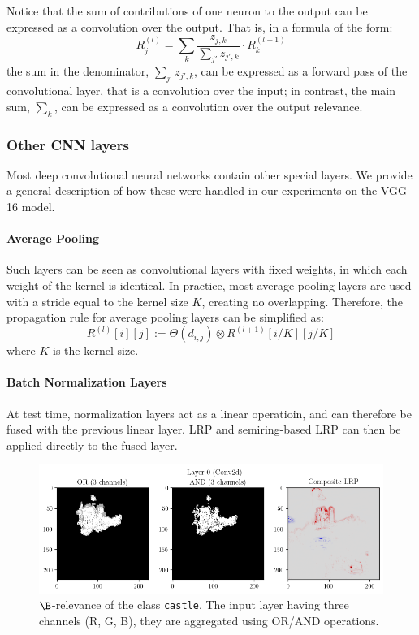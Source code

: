 \documentclass[twocolumn]{../cs-classes/cs-classes}
\newcommand*{\1}{\digitsbb{1}}
\newcommand*{\0}{\digitsbb{0}}
\begin{document}
Notice that the sum of contributions of one neuron to the output can be expressed as a convolution over the output. That is, in a formula of the form:
\begin{equation*}
    R_j^{(l)} = \sum_k \frac{z_{j,k}}{\sum_{j'}z_{j',k}} \cdot R_k^{(l+1)}
\end{equation*}
the sum in the denominator, $\sum_{j'}z_{j',k}$, can be expressed as a forward pass of the convolutional layer, that is a convolution over the input; in contrast, the main sum, $\sum_k$, can be expressed as a convolution over the output relevance.


\subsubsection{Other CNN layers}
Most deep convolutional neural networks contain other special layers. We provide a general description of how these were handled in our experiments on the VGG-16 model.

\paragraph*{Average Pooling}
Such layers can be seen as convolutional layers with fixed weights, in which each weight of the kernel is identical. In practice, most average pooling layers are used with a stride equal to the kernel size $K$, creating no overlapping. Therefore, the propagation rule for average pooling layers can be simplified as:
\begin{equation}
    R^{(l)}[i][j] := \Theta(d_{i,j}) \otimes R^{(l+1)}[i/K][j/K]
\end{equation}
where $K$ is the kernel size.

\paragraph*{Batch Normalization Layers}
At test time, normalization layers act as a linear operatioin, and can therefore be fused with the previous linear layer. LRP and semiring-based LRP can then be applied directly to the fused layer.

\begin{figure}
    \centering
    \includegraphics[width=.8\linewidth]{vgg-boolean.png}
    \caption{$\B$-relevance of the class \texttt{castle}. The input layer having three channels (R, G, B), they are aggregated using OR/AND operations.}
    \label{fig:vgg-boolean}
\end{figure}
\end{document}
